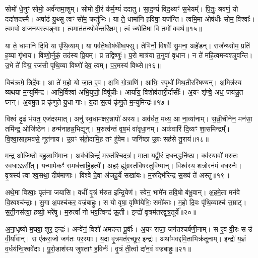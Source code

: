 सोमो॑ धे॒नुꣳ सोमो॒ अर्व॑न्तमा॒शुम्।
सोमो॑ वी॒रं क॑र्म॒ण्यं॑ ददातु।
सा॒द॒न्यं॑ विद॒थ्यꣳ॑ स॒भेयम्᳚।
पि॒तुः॒ श्रव॑णं॒ यो ददा॑शदस्मै।
अषा॑ढं यु॒थ्सु त्वꣳ सो॑म॒ क्रतु॑भिः।
या ते॒ धामा॑नि ह॒विषा॒ यज॑न्ति।
त्वमि॒मा ओष॑धीः सोम॒ विश्वाः᳚।
त्वम॒पो अ॑जनय॒स्त्वङ्गाः।
त्वमात॑तन्थो॒र्व॑न्तरि॑क्षम्।
त्वं ज्योति॑षा॒ वि तमो॑ ववर्थ॥१५॥

या ते॒ धामा॑नि दि॒वि या पृ॑थि॒व्याम्।
या पर्व॑ते॒ष्वोष॑धीष्व॒फ्सु।
तेभि॑र्नो॒ विश्वैः᳚ सु॒मना॒ अहे॑डन्।
राज᳚न्थ्सोम॒ प्रति॑ ह॒व्या गृ॑भाय।
विष्णो॒र्नुकं॒ तद॑स्य प्रि॒यम्।
प्र तद्विष्णुः॑।
प॒रो मात्र॑या त॒नुवा॑ वृधान।
न ते॑ महि॒त्वमन्व॑श्ञुवन्ति।
उ॒भे ते॑ विद्म॒ रज॑सी पृथि॒व्या विष्णो॑ देव॒ त्वम्।
प॒र॒मस्य॑ विथ्से॥१६॥

विच॑क्रमे॒ त्रिर्दे॒वः।
आ ते॑ म॒हो यो जा॒त ए॒व।
अ॒भि गो॒त्राणि॑।
आभिः॒ स्पृधो॑ मिथ॒तीररि॑षण्यन्।
अ॒मित्र॑स्य व्यथया म॒न्युमि॑न्द्र।
आभि॒र्विश्वा॑ अभि॒युजो॒ विषू॑चीः।
आर्या॑य॒ विशोव॑तारी॒र्दासीः᳚।
अ॒यꣳ शृ॑ण्वे॒ अध॒ जय॑न्नु॒त घ्नन्।
अ॒यमु॒त प्र कृ॑णुते यु॒धा गाः।
य॒दा स॒त्यं कृ॑णु॒ते म॒न्युमिन्द्रः॑॥१७॥

विश्वं॑ दृ॒ढं भ॑यत॒ एज॑दस्मात्।
अनु॑ स्व॒धाम॑क्षर॒न्नापो॑ अस्य।
अव॑र्धत॒ मध्य॒ आ ना॒व्या॑नाम्।
स॒ध्री॒चीने॑न॒ मन॑सा॒ तमि॑न्द्र॒ ओजि॑ष्ठेन।
हन्म॑नाहन्न॒भिद्यून्।
म॒रुत्व॑न्तं वृष॒भं वा॑वृधा॒नम्।
अक॑वारिं दि॒व्यꣳ शा॒समिन्द्रम्᳚।
वि॒श्वा॒साह॒मव॑से॒ नूत॑नाय।
उ॒ग्रꣳ स॑हो॒दामि॒ह तꣳ हु॑वेम।
जनि॑ष्ठा उ॒ग्रः सह॑से तु॒राय॑॥१८॥

म॒न्द्र ओजि॑ष्ठो बहु॒लाभि॑मानः।
अव॑र्ध॒न्निन्द्रं॑ म॒रुत॑श्चि॒दत्र॑।
मा॒ता यद्वी॒रं द॒धन॒द्धनि॑ष्ठा।
क्व॑स्यावो॑ मरुतः स्व॒धा\-ऽऽसी᳚त्।
यन्मामेकꣳ॑ स॒मध॑त्ताहि॒हत्ये᳚।
अ॒हꣴ ह्यु॑ग्रस्त॑वि॒षस्तुवि॑ष्मान्।
विश्व॑स्य॒ शत्रो॒रन॑मं वध॒स्नैः।
वृ॒त्रस्य॑ त्वा श्व॒सथा॒ दीष॑माणाः।
विश्वे॑ दे॒वा अ॑जहु॒र्ये सखा॑यः।
म॒रुद्भि॑रिन्द्र स॒ख्यं ते॑ अस्तु॥१९॥

अथे॒मा विश्वाः॒ पृत॑ना जयासि।
वधीं᳚ वृ॒त्रं म॑रुत इन्द्रि॒येण॑।
स्वेन॒ भामे॑न तवि॒षो ब॑भू॒वान्।
अ॒हमे॒ता मन॑वे वि॒श्वश्च॑न्द्राः।
सु॒गा अ॒पश्च॑कर॒ वज्र॑बाहुः।
स यो वृषा॒ वृष्णि॑येभिः॒ समो॑काः।
म॒हो दि॒वः पृ॑थि॒व्याश्च॑ स॒म्राट्।
स॒ती॒नस॑त्वा॒ हव्यो॒ भरे॑षु।
म॒रुत्वां᳚ नो भव॒त्विन्द्र॑ ऊ॒ती।
इन्द्रो॑ वृ॒त्रम॑तरद्वृत्र॒तूर्ये᳚॥२०॥

अ॒ना॒धृ॒ष्यो म॒घवा॒ शूर॒ इन्द्रः॑।
अन्वे॑नं॒ विशो॑ अमदन्त पू॒र्वीः।
अ॒यꣳ राजा॒ जग॑तश्चर्\mbox{}षणी॒नाम्।
स ए॒व वी॒रः स उ॑ वी॒र्या॑वान्।
स ए॑करा॒जो जग॑तः पर॒स्पाः।
य॒दा वृ॒त्रमत॑र॒च्छूर॒ इन्द्रः॑।
अथा॑भवद्दमि॒ताभिक्र॑तूनाम्।
इन्द्रो॑ य॒ज्ञं व॒र्धय॑न्वि॒श्ववे॑दाः।
पु॒रो॒डाश॑स्य जुषताꣳ ह॒विर्नः॑।
वृ॒त्रं ती॒र्त्वा दा॑न॒वं वज्र॑बाहुः॥२१॥

